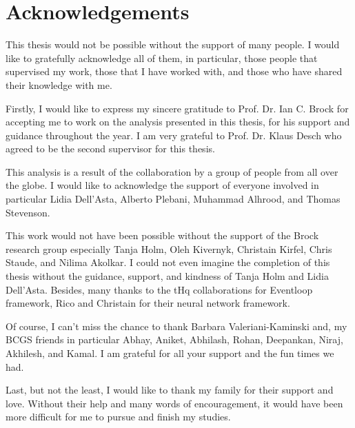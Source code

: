 \chapter*{Acknowledgements}
\label{sec:ack}

This thesis would not be possible without the support of many people. I would like to gratefully acknowledge all of them, in particular, those people that supervised my work, those that I have worked with, and those who have shared their knowledge with me. 

Firstly, I would like to express my sincere gratitude to Prof. Dr. Ian C. Brock for accepting me to work on the analysis presented in this thesis, for his support and guidance throughout the year. I am very grateful to Prof. Dr. Klaus Desch who agreed to be the second supervisor for this thesis. 

This analysis is a result of the collaboration by a group of people from all over the globe. I would like to acknowledge the support of everyone involved in particular Lidia Dell'Asta, Alberto Plebani, Muhammad Alhrood, and Thomas Stevenson. 

This work would not have been possible without the support of the Brock research group especially Tanja Holm, Oleh Kivernyk, Christain Kirfel, Chris Staude, and Nilima Akolkar. I could not even imagine the completion of this thesis without the guidance, support, and kindness of Tanja Holm and Lidia Dell'Asta. Besides, many thanks to the tHq collaborations for Eventloop framework, Rico and Christain for their neural network framework. 

Of course, I can't miss the chance to thank Barbara Valeriani-Kaminski and, my BCGS friends in particular Abhay, Aniket, Abhilash, Rohan, Deepankan, Niraj, Akhilesh, and Kamal. I am grateful for all your support and the fun times we had.

Last, but not the least, I would like  to thank my family for their support and love. Without their help and many words of encouragement, it would have been more difficult for me to pursue and finish my studies.

